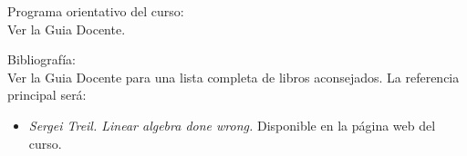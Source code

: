 \documentclass[12pt,a4paper]{amsart}
\begin{document}



\noindent\hrulefill{}  

 \noindent
{\sffamily Programa orientativo del curso:} \\
Ver la Guia Docente.
  

\noindent\hrulefill{}  

 \noindent
{\sffamily Bibliograf\'ia:} \\
Ver la Guia Docente para una lista completa de libros aconsejados. La referencia principal ser\'a:


\begin{itemize}
\item \emph{Sergei Treil. Linear algebra done wrong.} Disponible en la p\'agina web del curso. \end{itemize}

   
  

  
  
\end{document}
